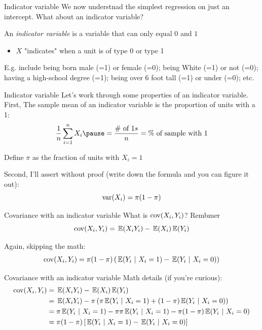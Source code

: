 \documentclass[aspectratio=169,t,11pt,table]{beamer}
\begin{document}
\begin{frame}{Indicator variable}
  We now understnad the simplest regression on just an intercept. What about an \alert{indicator variable}? 
  
  An \emph{indicator variable} is a variable that can only equal $0$ and $1$
  \begin{itemize}
    \item $X$ "indicates" when a unit is of type 0 or type 1
  \end{itemize}

  \bigskip
  E.g. include being born male (=1) or female (=0); being White (=1) or not (=0); having a high-school degree (=1); being over 6 foot tall (=1) or under (=0); etc.
\end{frame}

\begin{frame}{Indicator variable}
  Let's work through some properties of an indicator variable. First, The sample mean of an indicator variable is the proportion of units with a 1:
  $$
    \frac{1}{n} \sum_{i=1}^n X_i \pause = \frac{\# \text{ of } 1{s}}{n} = \text{\% of sample with 1}
  $$
  
  Define $\pi$ as the fraction of units with $X_i = 1$ 

  \pause
  \bigskip
  Second, I'll assert without proof (write down the formula and you can figure it out):
  $$
    \var(X_i) = \pi (1 - \pi)
  $$
\end{frame}

\begin{frame}{Covariance with an indicator variable}
  What is $\cov(X_i, Y_i)$? Rembmer
  $$
    \cov(X_i, Y_i) = \expec{X_i Y_i} - \expec{X_i} \expec{Y_i}
  $$
  
  \pause
  \bigskip
  Again, skipping the math:
  \begin{align*}
    \cov(X_i, Y_i) = \pi (1 - \pi) \left( \expec{Y_i}{X_i = 1} - \expec{Y_i}{X_i = 0} \right)
  \end{align*}
\end{frame}

\begin{frame}{Covariance with an indicator variable}
  Math details (if you're curious): 
  \begin{align*}
    \cov(X_i, Y_i) 
    &= \expec{X_i Y_i} - \expec{X_i} \expec{Y_i} \\
    &= \expec{X_i Y_i} - \pi \left( \pi \expec{Y_i}{X_i = 1} + (1 - \pi) \expec{Y_i}{X_i = 0} \right) \\
    &= \pi \expec{Y_i}{X_i = 1} - \pi \pi \expec{Y_i}{X_i = 1} - \pi (1 - \pi) \expec{Y_i}{X_i = 0} \\
    &= \pi (1 - \pi) \left[ \expec{Y_i}{X_i = 1} - \expec{Y_i}{X_i = 0} \right]
  \end{align*}
\end{frame}
\end{document}
